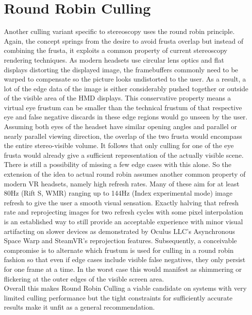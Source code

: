 \section{Round Robin Culling} \label{RRCull}
Another culling variant specific to stereoscopy uses the round robin principle. Again, the concept springs from the desire to avoid frusta overlap but instead of combining the frusta, it exploits a common property of current stereoscopy rendering techniques. As modern headsets use circular lens optics and flat displays distorting the displayed image, the framebuffers commonly need to be warped to compensate so the picture looks undistorted to the user. As a result, a lot of the edge data of the image is either considerably pushed together or outside of the visible area of the HMD displays.
This conservative property means a virtual eye frustum can be smaller than the technical frustum of that respective eye and false negative discards in these edge regions would go unseen by the user.
Assuming both eyes of the headset have similar opening angles and parallel or nearly parallel viewing direction, the overlap of the two frusta would encompass the entire stereo-visible volume. It follows that only culling for one of the eye frusta would already give a sufficient representation of the actually visible scene. \\
There is still a possibility of missing a few edge cases with this alone. So the extension of the idea to actual round robin assumes another common property of modern \gls{VR} headsets, namely high refresh rates. Many of these aim for at least 80Hz (Rift S, \gls{WMR}) ranging up to 144Hz (Index experimental mode) image refresh to give the user a smooth visual sensation.
Exactly halving that refresh rate and reprojecting images for two refresh cycles with some pixel interpolation is an established way to still provide an acceptable experience with minor visual artifacting on slower devices as demonstrated by Oculus LLC's Asynchronous Space Warp\cite{Beeler.2016} and SteamVR's reprojection\cite{ValveCorporation.2018} features. Subsequently, a conceivable compromise is to alternate which frustum is used for culling in a round robin fashion so that even if edge cases include visible false negatives, they only persist for one frame at a time. In the worst case this would manifest as shimmering or flickering at the outer edges of the visible screen area. \\
Overall this makes Round Robin Culling a viable candidate on systems with very limited culling performance but the tight constraints for sufficiently accurate results make it unfit as a general recommendation. 

